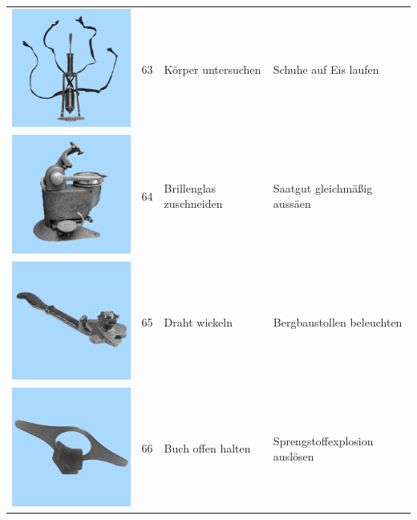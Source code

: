 \documentclass[
  english,
  man,floatsintext]{apa7}
\begin{document}
\begin{center}
\begin{ThreePartTable}
\begin{longtable}{llll}
\includegraphics[valign=c, scale=0.19]{../materials/unfamiliar/63.png} & 63 & Körper untersuchen & Schuhe auf Eis laufen\\
\includegraphics[valign=c, scale=0.19]{../materials/unfamiliar/64.png} & 64 & Brillenglas zuschneiden & Saatgut gleichmäßig aussäen\\
\includegraphics[valign=c, scale=0.19]{../materials/unfamiliar/65.png} & 65 & Draht wickeln & Bergbaustollen beleuchten\\
\includegraphics[valign=c, scale=0.19]{../materials/unfamiliar/66.png} & 66 & Buch offen halten & Sprengstoffexplosion auslösen\\

\end{longtable}
\end{ThreePartTable}
\end{center}
\end{document}
